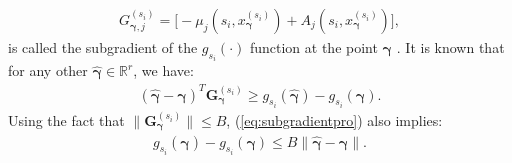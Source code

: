 \documentclass[journal]{IEEEtran}
\newcommand{\bv}[1]{{\boldsymbol{#1} }}
\newcommand{\script}[1]{{{\cal{#1} }}}
\begin{document}
\begin{eqnarray}
G^{(s_i)}_{\bv{\gamma},j}
=\big[-\mu_j(s_i, x_{\bv{\gamma}}^{(s_i)})+ A_j(s_i, x_{\bv{\gamma}}^{(s_i)})\big],\label{eq:subgradient_def_si}
\end{eqnarray}
is called the subgradient of the $g_{s_i}(\cdot)$ function at the point $\bv{\gamma}$ \cite{bertsekasoptbook}.  It is known that for any other $\hat{\bv{\gamma}}\in\mathbb{R}^r$, we have:
\begin{eqnarray}
(\hat{\bv{\gamma}}-\bv{\gamma})^{T}\bv{G}^{(s_i)}_{\bv{\gamma}}\geq g_{s_i}(\hat{\bv{\gamma}})-g_{s_i}(\bv{\gamma}).\label{eq:subgradientpro}
\end{eqnarray}
Using the fact that $\|\bv{G}^{(s_i)}_{\bv{\gamma}}\|\leq B$, (\ref{eq:subgradientpro}) also implies:
\begin{eqnarray}
g_{s_i}(\hat{\bv{\gamma}})-g_{s_i}(\bv{\gamma})\leq B\|\hat{\bv{\gamma}}-\bv{\gamma}\|.\label{eq:dualbddslope_si}
\end{eqnarray}






\end{document}
